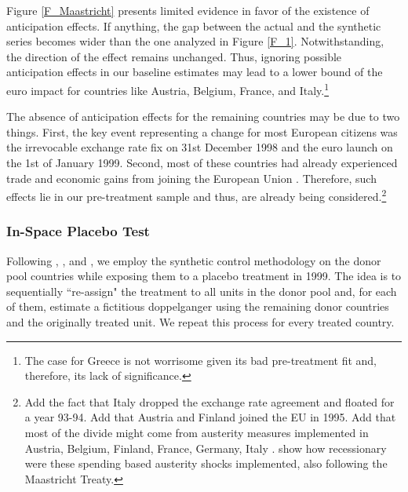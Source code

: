 \documentclass[12pt]{article}
\begin{document}
Figure \ref{F_Maastricht} presents limited evidence in favor of the existence of anticipation effects. If anything, the gap between the actual and the synthetic series becomes wider than the one analyzed in Figure \ref{F_1}. Notwithstanding, the direction of the effect remains unchanged. Thus, ignoring possible anticipation effects in our baseline estimates may lead to a lower bound of the euro impact for countries like Austria, Belgium, France, and Italy.\footnote{The case for Greece is not worrisome given its bad pre-treatment fit and, therefore, its lack of significance.}

The absence of anticipation effects for the remaining countries may be due to two things. First, the key event representing a change for most European citizens was the irrevocable exchange rate fix on 31st December 1998 and the euro launch on the 1st of January 1999. Second, most of these countries had already experienced trade and economic gains from joining the European Union \citep{Campos2018}. Therefore, such effects lie in our pre-treatment sample and thus, are already being considered.\footnote{Add the fact that Italy dropped the exchange rate agreement and floated for a year 93-94. Add that Austria and Finland joined the EU in 1995. Add that most of the divide might come from austerity measures implemented in Austria, Belgium, Finland, France, Germany, Italy \citep{Alesina2019}. \cite{Gabriel2023} show how recessionary were these spending based austerity shocks implemented, also following the Maastricht Treaty.}


\subsubsection{In-Space Placebo Test \label{SS_spaceplacebo}}

Following \cite{Abadie2010}, \cite{Abadie2018}, and \cite{Firpo2018}, we employ the synthetic control methodology on the donor pool countries while exposing them to a placebo treatment in 1999. The idea is to sequentially ``re-assign" the treatment to all units in the donor pool and, for each of them, estimate a fictitious doppelganger using the remaining donor countries and the originally treated unit. We repeat this process for every treated country.
\end{document}
